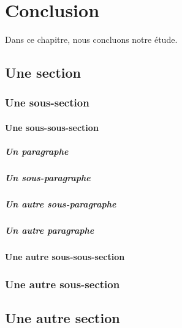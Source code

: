 \chapter{Conclusion}
%
Dans ce chapitre, nous concluons notre étude.

\lipsum[26-27]

\section{Une section}

\lipsum[28-29]

\subsection{Une sous-section}

\lipsum[29-31]

\subsubsection{Une sous-sous-section}

\lipsum[31-35]

\paragraph{Un paragraphe}

\lipsum[36-38]

\paragraph{Un sous-paragraphe}

\lipsum[39-41]

\paragraph{Un autre sous-paragraphe}

\lipsum[39-41]

\paragraph{Un autre paragraphe}

\lipsum[36-38]

\subsubsection{Une autre sous-sous-section}

\lipsum[31-35]

\subsection{Une autre sous-section}

\lipsum[29-31]

\section{Une autre section}

\lipsum[28-29]

